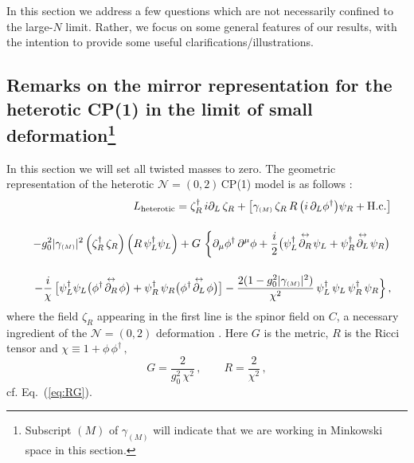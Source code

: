 \documentclass[epsfig,12pt]{article}
\def\beq{\begin{equation}}
\def\eeq{\end{equation}}
\def\beqn{\begin{eqnarray}}
\def\eeqn{\end{eqnarray}}
\newcommand{\nzt}{${\mathcal N}=(0,2)\,$}
\def\beqn{\begin{eqnarray}}
\def\eeqn{\end{eqnarray}}
\def\beq{\begin{equation}}
\def\eeq{\end{equation}}
\newcommand{\ssm}{{\scriptscriptstyle(M)}}
\begin{document}
{In this section we  address a few questions which are not necessarily confined to the large-$N$ limit.
Rather, we focus on some general features of our results, with the intention to provide
some useful clarifications/illustrations.

\subsection[Remarks on the mirror representation
for the heterotic CP(1) in the limit of small deformation]
{Remarks on the mirror representation
for the heterotic CP(1) in the limit of small deformation\footnote{Subscript 
$\ssm$ of $\gamma_\ssm$ will indicate that we are working in Minkowski space in this section.}}

In this section we will set all twisted masses to zero.
The geometric representation of  the heterotic \nzt CP(1) model is as follows \cite{SY1}:
\beqn
\label{AAone}
&&
L_{{\rm heterotic}}= 
\zeta_R^\dagger \, i\partial_L \, \zeta_R  + 
\left[\gamma_\ssm \, \zeta_R  \,R\,  \big( i\,\partial_{L}\phi^{\dagger} \big)\psi_R
+{\rm H.c.}\right] \\[4mm]
&&
-g_0^2|\gamma_\ssm |^2 \left(\zeta_R^\dagger\, \zeta_R
\right)\left(R\,  \psi_L^\dagger\psi_L\right)
\nonumber
+
G\, \left\{\rule{0mm}{5mm}
\partial_\mu \phi^\dagger\, \partial^\mu\phi  
+\frac{i}{2}\big(\psi_L^\dagger\!\stackrel{\leftrightarrow}{\partial_R}\!\psi_L 
+ \psi_R^\dagger\!\stackrel{\leftrightarrow}{\partial_L}\!\psi_R
\big)\right.
\nonumber
\\[4mm] 
&&
-\frac{i}{\chi}\,  \big[\psi_L^\dagger \psi_L
\big(\phi^\dagger \!\stackrel{\leftrightarrow}{\partial_R}\!\phi
\big)+ \psi_R^\dagger\, \psi_R
\big(\phi^\dagger\!\stackrel{\leftrightarrow}{\partial_L}\!\phi
\big)
\big]
-
\frac{2(1- g_0^2 |\gamma_\ssm |^2)}{\chi^2}\,\psi_L^\dagger\,\psi_L \,\psi_R^\dagger\,\psi_R
\Big\}\,,
\nonumber
\eeqn
where the field $\zeta_R$ appearing in the first line is
the spinor field on $C$, a  necessary ingredient  of the ${\mathcal N}=(0,2)$ deformation
\cite{EdTo}.
Here $G$ is the metric, $R$ is the Ricci tensor and $\chi \equiv 1+\phi\,\phi^\dagger\,,$
\beq
G=
\frac{2}{g_{0}^2\,\chi^{2}}\,,\qquad R =\frac{2}{\chi^2}\,,
\label{fsmetrone}
\eeq
cf. Eq.~(\ref{eq:RG}).

}
\end{document}
